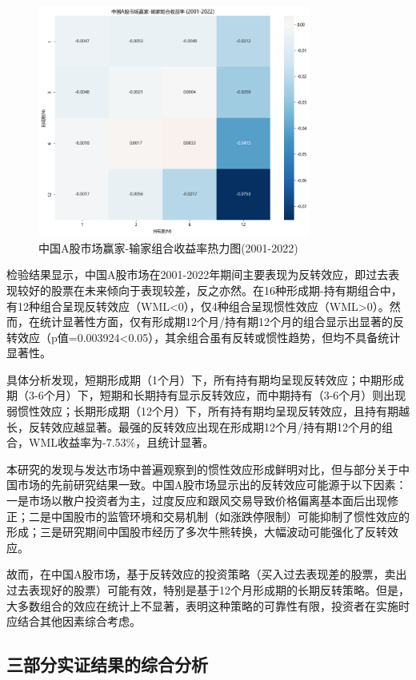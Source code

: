 \documentclass[12pt, a4paper]{article}
\begin{document}
\begin{figure}[htbp]
\centering
\includegraphics[width=0.8\textwidth]{./img/heap.png}
\caption{中国A股市场赢家-输家组合收益率热力图(2001-2022)}
\label{fig:wml_heatmap}
\end{figure}

检验结果显示，中国A股市场在2001-2022年期间主要表现为反转效应，即过去表现较好的股票在未来倾向于表现较差，反之亦然。在16种形成期-持有期组合中，有12种组合呈现反转效应（WML<0），仅4种组合呈现惯性效应（WML>0）。然而，在统计显著性方面，仅有形成期12个月/持有期12个月的组合显示出显著的反转效应（p值=0.003924<0.05），其余组合虽有反转或惯性趋势，但均不具备统计显著性。

具体分析发现，短期形成期（1个月）下，所有持有期均呈现反转效应；中期形成期（3-6个月）下，短期和长期持有显示反转效应，而中期持有（3-6个月）则出现弱惯性效应；长期形成期（12个月）下，所有持有期均呈现反转效应，且持有期越长，反转效应越显著。最强的反转效应出现在形成期12个月/持有期12个月的组合，WML收益率为-7.53\%，且统计显著。

本研究的发现与发达市场中普遍观察到的惯性效应形成鲜明对比，但与部分关于中国市场的先前研究结果一致。中国A股市场显示出的反转效应可能源于以下因素：一是市场以散户投资者为主，过度反应和跟风交易导致价格偏离基本面后出现修正；二是中国股市的监管环境和交易机制（如涨跌停限制）可能抑制了惯性效应的形成；三是研究期间中国股市经历了多次牛熊转换，大幅波动可能强化了反转效应。

故而，在中国A股市场，基于反转效应的投资策略（买入过去表现差的股票，卖出过去表现好的股票）可能有效，特别是基于12个月形成期的长期反转策略。但是，大多数组合的效应在统计上不显著，表明这种策略的可靠性有限，投资者在实施时应结合其他因素综合考虑。

\subsection{三部分实证结果的综合分析}
\end{document}
